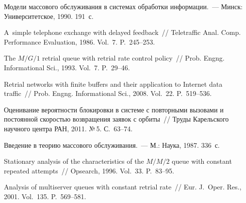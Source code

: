 \begin{multicols}{2}
{{\begin{thebibliography}{99}
 Модели массового обслуживания в
    системах обработки информации.~--- Минск: Университетское, 1990. 191~с.

 A~simple telephone exchange with delayed
    feedback~// Teletraffic Anal. Comp. Performance Evaluation,  1986. Vol.~7. P.~245--253.

 The $M/G/1$
    retrial queue with retrial rate control policy~// Prob. 
    Engng. Informational Sci.,  1993.  Vol.~7. P.~29--46.

 Retrial networks with
    finite buffers and their application to Internet data traffic~// Prob.
Engng. Informational Sci., 2008. Vol.~22. P.~519--536.

 Оценивание
    вероят\-ности блокировки в системе с повторными вызовами и постоянной
    скоростью возвращения заявок с орбиты~// Труды Карельского научного центра
    РАН, 2011.  №\,5. С.~63--74.
    
 Введение  в
    теорию массового обслуживания.~--- М.: Наука, 1987. 336~с.

 Stationary analysis of the characteristics
of the $M/M/2$ queue with constant repeated attempts~// Opsearch,
1996. Vol.~33. P.~83--95.

\label{end\stat}
    
Analysis of multiserver queues with constant retrial rate~//
Eur. J.~Oper. Res., 2001. Vol.~135. P.~569--581.
 \end{thebibliography}
}
}


\end{multicols}